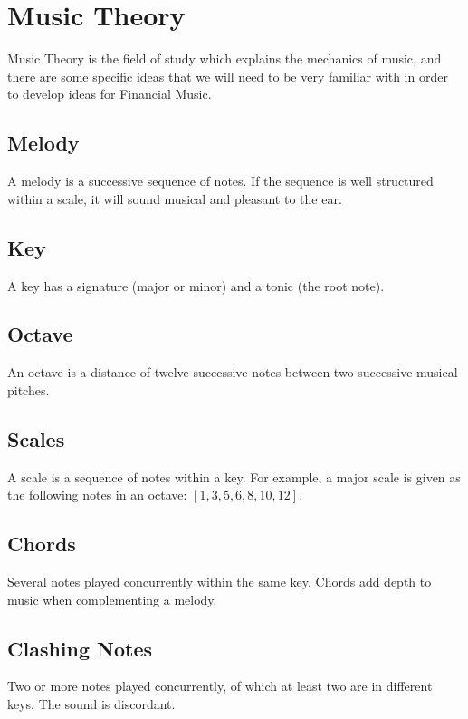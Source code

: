 \section{Music Theory}

Music Theory is the field of study which explains the mechanics of music, and there are some specific ideas that we will need to be very familiar with in order to develop ideas for Financial Music.

\begin{singlespace}
\begin{formality}
\subsection*{Melody}

A melody is a successive sequence of notes. If the sequence is well structured within a scale, it will sound musical and pleasant to the ear.

\subsection*{Key}

A key has a signature (major or minor) and a tonic (the root note).

\subsection*{Octave}

An octave is a distance of twelve successive notes between two successive musical pitches.

\subsection*{Scales}

A scale is a sequence of notes within a key. For example, a major scale is given as the following notes in an octave: $[1, 3, 5, 6, 8, 10, 12]$.

\subsection*{Chords}

Several notes played concurrently within the same key. Chords add depth to music when complementing a melody.

\subsection*{Clashing Notes}

Two or more notes played concurrently, of which at least two are in different keys. The sound is discordant.
\end{formality}
\end{singlespace}

